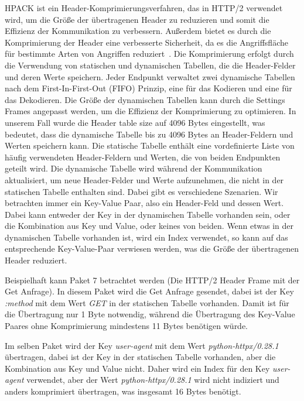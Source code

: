 HPACK ist ein Header-Komprimierungsverfahren, das in HTTP/2 verwendet wird, um die Größe der übertragenen Header zu reduzieren und somit die Effizienz der Kommunikation zu verbessern.
Außerdem bietet es durch die Komprimierung der Header eine verbesserte Sicherheit, da es die Angriffsfläche für bestimmte Arten von Angriffen reduziert~\cite{rfc7541_http2_hpack}.
Die Komprimierung erfolgt durch die Verwendung von statischen und dynamischen Tabellen, die die Header-Felder und deren Werte speichern.
Jeder Endpunkt verwaltet zwei dynamische Tabellen nach dem First-In-First-Out (FIFO) Prinzip, eine für das Kodieren und eine für das Dekodieren.
Die Größe der dynamischen Tabellen kann durch die Settings Frames angepasst werden, um die Effizienz der Komprimierung zu optimieren.
In unserem Fall wurde die Header table size auf 4096 Bytes eingestellt, was bedeutet, dass die dynamische Tabelle bis zu 4096 Bytes an Header-Feldern und Werten speichern kann.
Die statische Tabelle enthält eine vordefinierte Liste von häufig verwendeten Header-Feldern und Werten, die von beiden Endpunkten geteilt wird.
Die dynamische Tabelle wird während der Kommunikation aktualisiert, um neue Header-Felder und Werte aufzunehmen, die nicht in der statischen Tabelle enthalten sind.
Dabei gibt es verschiedene Szenarien.
Wir betrachten immer ein Key-Value Paar, also ein Header-Feld und dessen Wert.
Dabei kann entweder der Key in der dynamischen Tabelle vorhanden sein, oder die Kombination aus Key und Value, oder keines von beiden.
Wenn etwas in der dynamischen Tabelle vorhanden ist, wird ein Index verwendet, so kann auf das entsprechende Key-Value-Paar verwiesen werden, was die Größe der übertragenen Header reduziert.~\cite{rfc7541_http2_hpack}

Beispielhaft kann Paket 7 betrachtet werden (Die HTTP/2 Header Frame mit der Get Anfrage).
In diesem Paket wird die Get Anfrage gesendet, dabei ist der Key \textit{:method} mit dem Wert \textit{GET} in der statischen Tabelle vorhanden.
Damit ist für die Übertragung nur 1 Byte notwendig, während die Übertragung des Key-Value Paares ohne Komprimierung mindestens 11 Bytes benötigen würde.

Im selben Paket wird der Key \textit{user-agent} mit dem Wert \textit{python-httpx/0.28.1} übertragen, dabei ist der Key in der statischen Tabelle vorhanden, aber die Kombination aus Key und Value nicht.
Daher wird ein Index für den Key \textit{user-agent} verwendet, aber der Wert \textit{python-httpx/0.28.1} wird nicht indiziert und anders komprimiert übertragen, was insgesamt 16 Bytes benötigt.
